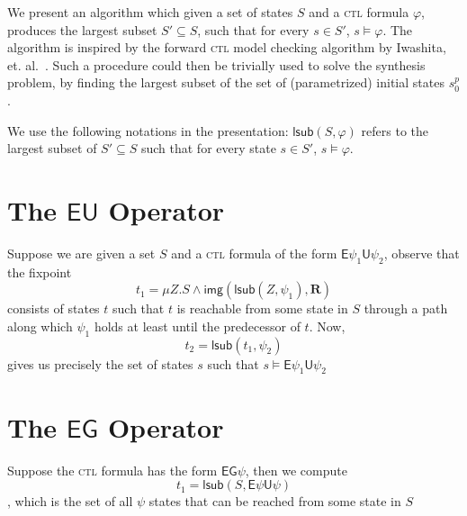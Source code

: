 \documentclass[10pt]{article}
\newcommand{\ctl}{\textsc{ctl}\xspace}
\newcommand{\ctrans}{\ensuremath{\mathbf{R}}\xspace}
\newcommand{\eg}[1]{\ensuremath{\mathsf{EG}#1\xspace}}
\newcommand{\eu}[2]{\ensuremath{\mathsf{E}#1 \mathsf{U} #2\xspace}}
\newcommand{\post}[2]{\ensuremath{\mathsf{img}(#1, #2)}\xspace}
\newcommand{\lsub}[2]{\ensuremath{\mathsf{lsub}(#1, #2)}\xspace}
\begin{document}
\begin{spacing}{1}
We present an algorithm which given a set of states $S$ and a \ctl formula
$\varphi$, produces the largest subset $S' \subseteq S$, such that for
every $s \in S'$, $s \models \varphi$. The algorithm is inspired by the
forward \ctl model checking algorithm by Iwashita,
et. al.~\cite{ctl-forward}. Such a procedure could then be trivially used
to solve the synthesis problem, by finding the largest subset of the set of
(parametrized) initial states $s_0^p$.

We use the following notations in the presentation: \lsub{S}{\varphi}
refers to the largest subset of $S' \subseteq S$ such that for every state
$s \in S'$, $s \models \varphi$.

\section{The \eu{}{} Operator}
Suppose we are given a set $S$ and a \ctl formula of the form
\eu{\psi_1}{\psi_2}, observe that the fixpoint
$$t_1 = \mu Z. S \wedge \post{\lsub{Z}{\psi_1}}{\ctrans}$$
consists of states $t$ such that $t$ is reachable from some state in $S$
through a path along which $\psi_1$ holds at least until the predecessor of
$t$. Now,
$$t_2 = \lsub{t_1}{\psi_2}$$ gives us precisely the set of states $s$ such
that $s \models \eu{\psi_1}{\psi_2}$

\section{The \eg{} Operator}
Suppose the \ctl formula has the form $\eg{\psi}$, then we compute
$$t_1 = \lsub{S}{\eu{\psi}{\psi}}$$,
which is the set of all $\psi$ states that can be reached from some state
in $S$




\end{spacing}
\end{document}
